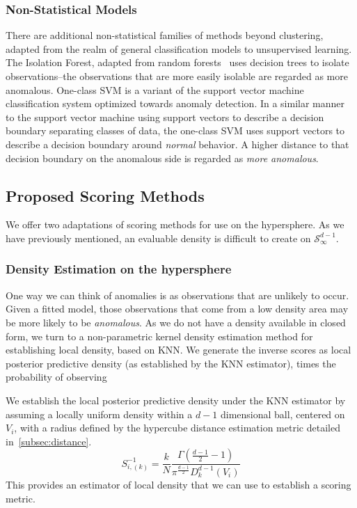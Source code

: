 \subsubsection{Non-Statistical Models}
There are additional non-statistical families of methods beyond clustering, adapted from the realm
  of general classification models to unsupervised learning.  The Isolation Forest,\citep{liu2000}
  adapted from random forests~\citep{breiman2001} uses decision trees to isolate observations--the
  observations that are more easily isolable are regarded as more anomalous.  One-class SVM is a
  variant of the support vector machine classification system optimized towards anomaly detection.
  In a similar manner to the support vector machine using support vectors to describe a decision
  boundary separating classes of data, the one-class SVM uses support vectors to describe a decision
  boundary around \emph{normal} behavior.  A higher distance to that decision boundary on the
  anomalous side is regarded as \emph{more anomalous}.


\subsection{Proposed Scoring Methods}
We offer two adaptations of scoring methods for use on the hypersphere.  As we have previously
  mentioned, an evaluable density is difficult to create on $\mathcal{S}_{\infty}^{d-1}$.

\subsubsection{Density Estimation on the hypersphere}
One way we can think of anomalies is as observations that are unlikely to occur.  Given a fitted model,
  those observations that come from a low density area may be more likely to be \emph{anomalous}.
  As we do not have a density available in closed form, we turn to a non-parametric kernel density
  estimation method for establishing local density, based on KNN.  We generate the inverse scores as
  local posterior predictive density (as established by the KNN estimator), times the probability of
  observing

We establish the local posterior predictive density under the KNN estimator by assuming a locally
  uniform density within a $d-1$ dimensional ball, centered on $V_i$, with a radius defined by
  the hypercube distance estimation metric detailed in~\ref{subsec:distance}.
  \begin{equation}
    \label{eqn:ad_knn}
      S_{i,(k)}^{-1} =
        \frac{k}{N}\frac{\Gamma\left(\frac{d-1}{2} - 1\right)}{\pi^{\frac{d-1}{2}}D_{k}^{d-1}(V_i)}
  \end{equation}
  This provides an estimator of local density that we can use to establish a scoring metric.

